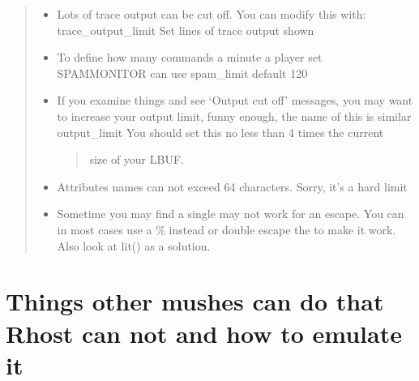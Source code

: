 \documentclass[letterpaper,10pt,english]{sphinxmanual}
\begin{document}
\begin{quote}
\begin{itemize}
\item {} 
\sphinxAtStartPar
Lots of trace output can be cut off.  You can modify this with:
\sphinxhyphen{} trace\_output\_limit   \sphinxhyphen{} Set lines of trace output shown

\item {} 
\sphinxAtStartPar
To define how many commands a minute a player set SPAMMONITOR can use
\sphinxhyphen{} spam\_limit \textendash{} default 120

\item {} 
\sphinxAtStartPar
If you examine things and see ‘Output cut off’ messages, you may want
to increase your output limit, funny enough, the name of this is
similar
\sphinxhyphen{} output\_limit \sphinxhyphen{} You should set this no less than 4 times the current
\begin{quote}

\sphinxAtStartPar
size of your LBUF.
\end{quote}

\item {} 
\sphinxAtStartPar
Attributes names can not exceed 64 characters.  Sorry, it’s a hard limit

\item {} 
\sphinxAtStartPar
Sometime you may find a single may not work for an escape.  You can
in most cases use a \% instead or double escape the to make it work.
Also look at lit() as a solution.

\end{itemize}
\end{quote}


\section{Things other mushes can do that Rhost can not and how to emulate it}
\label{\detokenize{12-advanced:things-other-mushes-can-do-that-rhost-can-not-and-how-to-emulate-it}}
\end{document}
